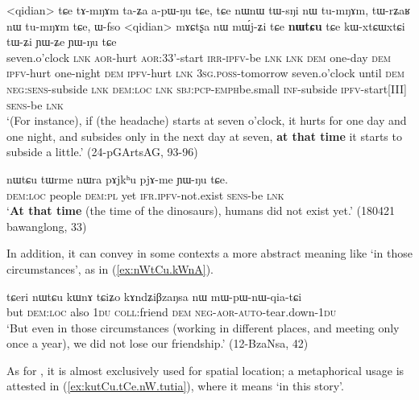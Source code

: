 \begin{exe}
\ex \label{ex:nWtCu.temporal}
\gll <qidian> tɕe tɤ-mŋɤm ta-ʑa a-pɯ-ŋu tɕe, tɕe nɯnɯ tɯ-sŋi nɯ tu-mŋɤm, tɯ-rʑaʁ nɯ tu-mŋɤm tɕe, ɯ-fso <qidian> mɤɕtʂa nɯ mɯ́j-ʑi tɕe \textbf{nɯtɕu} tɕe kɯ-xtɕɯ\redp{}xtɕi tɯ-ʑi ɲɯ-ʑe ɲɯ-ŋu tɕe \\
seven.o'clock \textsc{lnk} \textsc{aor}-hurt \textsc{aor}:3\fl{}3'-start \textsc{irr}-\textsc{ipfv}-be \textsc{lnk} \textsc{lnk} \textsc{dem} one-day \textsc{dem} \textsc{ipfv}-hurt  one-night \textsc{dem} \textsc{ipfv}-hurt  \textsc{lnk}  \textsc{3sg}.\textsc{poss}-tomorrow seven.o'clock until \textsc{dem} \textsc{neg}:\textsc{sens}-subside \textsc{lnk} \textsc{dem}:\textsc{loc} \textsc{lnk} \textsc{sbj}:\textsc{pcp}-\textsc{emph}\redp{}be.small \textsc{inf}-subside \textsc{ipfv}-start[III] \textsc{sens}-be \textsc{lnk} \\
\glt `(For instance), if (the headache) starts at seven o'clock, it hurts for one day and one night, and subsides only in the next day at seven, \textbf{at that time} it starts to subside a little.' (24-pGArtsAG, 93-96)
\end{exe}

\begin{exe}
\ex \label{ex:nWtCu.temporal2}
\gll  nɯtɕu tɯrme nɯra pɤjkʰu pjɤ-me ɲɯ-ŋu tɕe. \\
\textsc{dem}:\textsc{loc} people \textsc{dem}:\textsc{pl} yet \textsc{ifr}.\textsc{ipfv}-not.exist \textsc{sens}-be \textsc{lnk}  \\
\glt `\textbf{At that time} (the time of the dinosaurs), humans did not exist yet.' (180421 bawanglong, 33)
\end{exe}

In addition, it can convey in some contexts a more abstract meaning like `in those circumstances', as in (\ref{ex:nWtCu.kWnA}).

\begin{exe}
\ex \label{ex:nWtCu.kWnA}
\gll tɕeri nɯtɕu kɯnɤ tɕiʑo kɤndʑiβzaŋsa nɯ mɯ-pɯ-nɯ-qia-tɕi \\
but \textsc{dem}:\textsc{loc} also \textsc{1du} \textsc{coll}:friend \textsc{dem} \textsc{neg}-\textsc{aor}-\textsc{auto}-tear.down-\textsc{1du} \\
\glt `But even in those circumstances (working in different places, and meeting only once a year), we did not lose our friendship.' (12-BzaNsa, 42)
\end{exe}

As for , it is almost exclusively used for spatial location; a metaphorical usage is attested in (\ref{ex:kutCu.tCe.nW.tutia}), where it means `in this story'.

